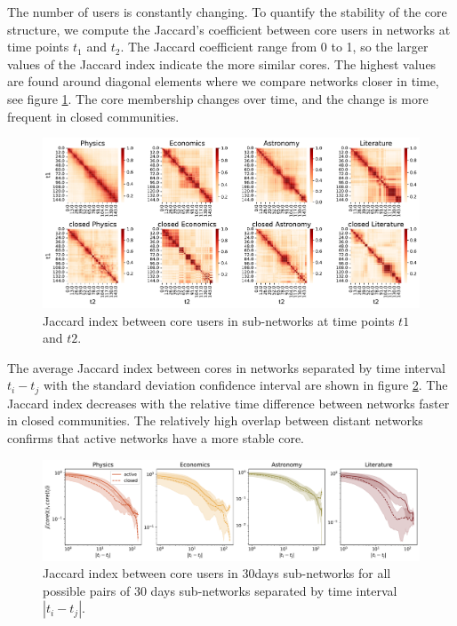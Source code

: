 The number of users is constantly changing. To quantify the stability of the core structure, we compute the Jaccard's coefficient between core users in networks at time points $t_1$ and $t_2$. The Jaccard coefficient range from 0 to 1, so the larger values of the Jaccard index indicate the more similar cores. 
The highest values are found around diagonal elements where we compare networks closer in time, see figure \ref{fig:jaccard_hm}. The core membership changes over time, and the change is more frequent in closed communities. 

\begin{figure}[h!]
	\centering
	\includegraphics[width=\linewidth]{figures/stackexchange/jaccard_heatmap.pdf}
	\caption[Mean Jaccard index between core users.]{Jaccard index between core users in  sub-networks at time points $t1$ and $t2$.}
	\label{fig:jaccard_hm}
\end{figure}  

The average Jaccard index between cores in networks separated by time interval $t_i-t_j$ with the standard deviation confidence interval are shown in figure \ref{fig:jaccard_mean}. The Jaccard index decreases with the relative time difference between networks faster in closed communities. The relatively high overlap between distant networks confirms that active networks have a more stable core. 

\begin{figure}[h!]
	\centering
	\includegraphics[width=\linewidth]{figures/stackexchange/jaccard.pdf}
	\caption[Mean Jaccard index between core users.]{Jaccard index between core users in 30days sub-networks for all possible pairs of 30 days sub-networks separated by time interval $|t_i - t_j|$.}
	\label{fig:jaccard_mean}
\end{figure}


